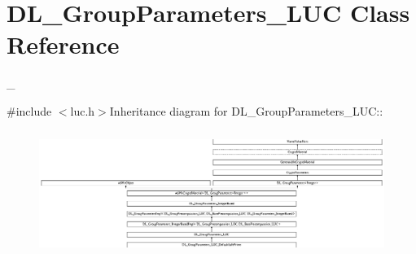 \hypertarget{class_d_l___group_parameters___l_u_c}{
\section{DL\_\-GroupParameters\_\-LUC Class Reference}
\label{class_d_l___group_parameters___l_u_c}
}


\_\-  


{\ttfamily \#include $<$luc.h$>$}Inheritance diagram for DL\_\-GroupParameters\_\-LUC::\begin{figure}[H]
\begin{center}
\leavevmode
\includegraphics[height=4.08488cm]{class_d_l___group_parameters___l_u_c}
\end{center}
\end{figure}
